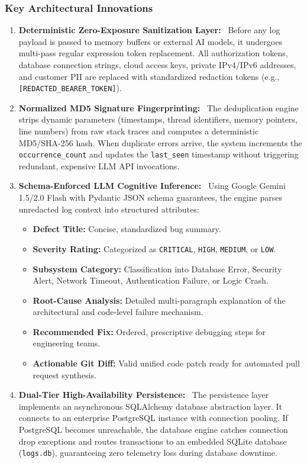 \documentclass[12pt,a4paper]{article}
\newcommand{\lead}[1]{\textbf{#1}\ }
\begin{document}
\subsubsection{Key Architectural Innovations}
\begin{enumerate}[leftmargin=1.5em]
    \item \lead{Deterministic Zero-Exposure Sanitization Layer:} Before any log payload is passed to memory buffers or external AI models, it undergoes multi-pass regular expression token replacement. All authorization tokens, database connection strings, cloud access keys, private IPv4/IPv6 addresses, and customer PII are replaced with standardized redaction tokens (e.g., \texttt{[REDACTED\_BEARER\_TOKEN]}).
    \item \lead{Normalized MD5 Signature Fingerprinting:} The deduplication engine strips dynamic parameters (timestamps, thread identifiers, memory pointers, line numbers) from raw stack traces and computes a deterministic MD5/SHA-256 hash. When duplicate errors arrive, the system increments the \texttt{occurrence\_count} and updates the \texttt{last\_seen} timestamp without triggering redundant, expensive LLM API invocations.
    \item \lead{Schema-Enforced LLM Cognitive Inference:} Using Google Gemini 1.5/2.0 Flash with Pydantic JSON schema guarantees, the engine parses unredacted log context into structured attributes:
    \begin{itemize}
        \item \textbf{Defect Title:} Concise, standardized bug summary.
        \item \textbf{Severity Rating:} Categorized as \texttt{CRITICAL}, \texttt{HIGH}, \texttt{MEDIUM}, or \texttt{LOW}.
        \item \textbf{Subsystem Category:} Classification into Database Error, Security Alert, Network Timeout, Authentication Failure, or Logic Crash.
        \item \textbf{Root-Cause Analysis:} Detailed multi-paragraph explanation of the architectural and code-level failure mechanism.
        \item \textbf{Recommended Fix:} Ordered, prescriptive debugging steps for engineering teams.
        \item \textbf{Actionable Git Diff:} Valid unified code patch ready for automated pull request synthesis.
    \end{itemize}
    \item \lead{Dual-Tier High-Availability Persistence:} The persistence layer implements an asynchronous SQLAlchemy database abstraction layer. It connects to an enterprise PostgreSQL instance with connection pooling. If PostgreSQL becomes unreachable, the database engine catches connection drop exceptions and routes transactions to an embedded SQLite database (\texttt{logs.db}), guaranteeing zero telemetry loss during database downtime.

\end{enumerate}
\end{document}
